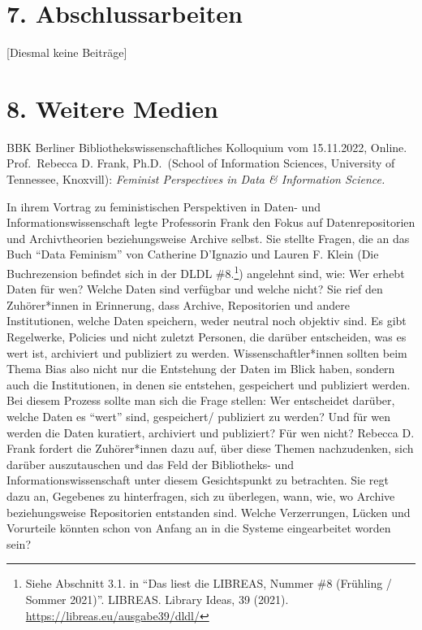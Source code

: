 \documentclass[a4paper,
fontsize=11pt,
oneside,
numbers=noperiodatend,
parskip=half-,
bibliography=totoc,
final
]{scrartcl}
\begin{document}
\hypertarget{abschlussarbeiten}{%
\section{7. Abschlussarbeiten}\label{abschlussarbeiten}}

{[}Diesmal keine Beiträge{]}

\hypertarget{weitere-medien}{%
\section{8. Weitere Medien}\label{weitere-medien}}

BBK Berliner Bibliothekswissenschaftliches Kolloquium vom 15.11.2022,
Online. Prof.~Rebecca D. Frank, Ph.D.~(School of Information Sciences,
University of Tennessee, Knoxvill): \emph{Feminist Perspectives in Data
\& Information Science.}

In ihrem Vortrag zu feministischen Perspektiven in Daten- und
Informationswissenschaft legte Professorin Frank den Fokus auf
Datenrepositorien und Archivtheorien beziehungsweise Archive selbst. Sie
stellte Fragen, die an das Buch \enquote{Data Feminism} von Catherine
D'Ignazio und Lauren F. Klein (Die Buchrezension befindet sich in der
DLDL \#8.\footnote{Siehe Abschnitt 3.1. in \enquote{Das liest die LIBREAS,
  Nummer \#8 (Frühling / Sommer 2021)}. LIBREAS. Library Ideas, 39
  (2021). \url{https://libreas.eu/ausgabe39/dldl/}}) angelehnt sind,
wie: Wer erhebt Daten für wen? Welche Daten sind verfügbar und welche
nicht? Sie rief den Zuhörer*innen in Erinnerung, dass Archive,
Repositorien und andere Institutionen, welche Daten speichern, weder
neutral noch objektiv sind. Es gibt Regelwerke, Policies und nicht
zuletzt Personen, die darüber entscheiden, was es wert ist, archiviert
und publiziert zu werden. Wissenschaftler*innen sollten beim Thema Bias
also nicht nur die Entstehung der Daten im Blick haben, sondern auch die
Institutionen, in denen sie entstehen, gespeichert und publiziert
werden. Bei diesem Prozess sollte man sich die Frage stellen: Wer
entscheidet darüber, welche Daten es \enquote{wert} sind, gespeichert/
publiziert zu werden? Und für wen werden die Daten kuratiert, archiviert
und publiziert? Für wen nicht? Rebecca D. Frank fordert die
Zuhörer*innen dazu auf, über diese Themen nachzudenken, sich darüber
auszutauschen und das Feld der Bibliotheks- und Informationswissenschaft
unter diesem Gesichtspunkt zu betrachten. Sie regt dazu an, Gegebenes zu
hinterfragen, sich zu überlegen, wann, wie, wo Archive beziehungsweise
Repositorien entstanden sind. Welche Verzerrungen, Lücken und Vorurteile
könnten schon von Anfang an in die Systeme eingearbeitet worden sein?
\end{document}
